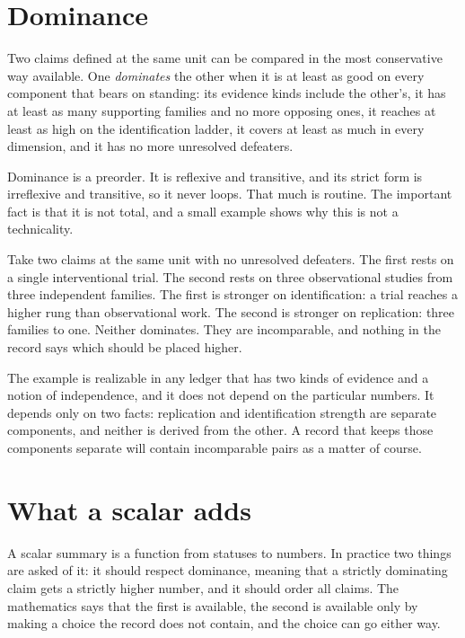 \documentclass[11pt]{article}
\begin{document}
\section{Dominance}\label{sec:dominance}

Two claims defined at the same unit can be compared in the most conservative way available. One \emph{dominates} the other when it is at least as good on every component that bears on standing: its evidence kinds include the other's, it has at least as many supporting families and no more opposing ones, it reaches at least as high on the identification ladder, it covers at least as much in every dimension, and it has no more unresolved defeaters.

Dominance is a preorder. It is reflexive and transitive, and its strict form is irreflexive and transitive, so it never loops. That much is routine. The important fact is that it is not total, and a small example shows why this is not a technicality.

Take two claims at the same unit with no unresolved defeaters. The first rests on a single interventional trial. The second rests on three observational studies from three independent families. The first is stronger on identification: a trial reaches a higher rung than observational work. The second is stronger on replication: three families to one. Neither dominates. They are incomparable, and nothing in the record says which should be placed higher.

The example is realizable in any ledger that has two kinds of evidence and a notion of independence, and it does not depend on the particular numbers. It depends only on two facts: replication and identification strength are separate components, and neither is derived from the other. A record that keeps those components separate will contain incomparable pairs as a matter of course.

\section{What a scalar adds}\label{sec:scalar}

A scalar summary is a function from statuses to numbers. In practice two things are asked of it: it should respect dominance, meaning that a strictly dominating claim gets a strictly higher number, and it should order all claims. The mathematics says that the first is available, the second is available only by making a choice the record does not contain, and the choice can go either way.
\end{document}
